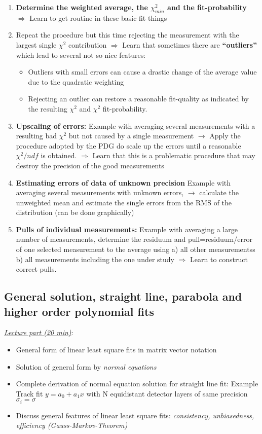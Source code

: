 \documentclass[12pt]{article}
\begin{document}
\begin{enumerate}
\item
{\bf Determine the weighted average, the
$\chi^2_{min}$ and the fit-probability}
$\Rightarrow$ Learn to get routine in these basic fit things
\item
Repeat the procedure but this time rejecting the measurement with the
largest single $\chi^2$ contribution
$\Rightarrow$ 
Learn that sometimes there are {\bf ``outliers''}
which lead to several not so nice features:
\begin{itemize} 
\item
Outliers with small errors can cause a drastic change of
the average value due to the quadratic weighting
\item
Rejecting an outlier can restore a reasonable fit-quality
as indicated by the resulting $\chi^2$ and $\chi^2$ fit-probability.
\end{itemize}
\item {\bf Upscaling of errors:}
Example with averaging several measurements with a resulting
bad $\chi^2$ but not caused by a single measurement $\rightarrow$
Apply the procedure adopted by the PDG do scale up the errors
until a reasonable  $\chi^2/ndf$ is obtained.
$\Rightarrow$ Learn that this is a problematic procedure that may
destroy the precision of the good measurements
\item{\bf Estimating errors of data of unknown precision}
Example with averaging several measurements with unknown errors,
$\rightarrow$ calculate the unweighted mean and estimate the 
single errors from the RMS of the distribution (can be done
graphically)
\item {\bf Pulls of individual measurements:}
Example with averaging a large number of measurements, determine
the residuum and pull=residuum/error
of one selected measurement to the average
using a) all other measurementss b) all measurements including
the one under study
$\Rightarrow$ Learn to construct correct pulls.
\end{enumerate}
%
%
\newpage
\subsection{General solution, straight line, parabola and
higher order polynomial fits}
{\em \underline{Lecture part (20 min)}}:
\begin{itemize}
\item
General form of linear least square fits in matrix vector
notation
\item 
Solution of general form by {\em normal equations}
\item
Complete derivation of normal equation solution 
for straight line fit: Example Track fit $y = a_0 + a_1 x$
with N equidistant detector layers of 
same precision $\sigma_i = \sigma$
\item
Discuss general features of linear least square fits:
{\em consistency, unbiasedness, efficiency (Gauss-Markov-Theorem)}
\end{itemize}
\end{document}
